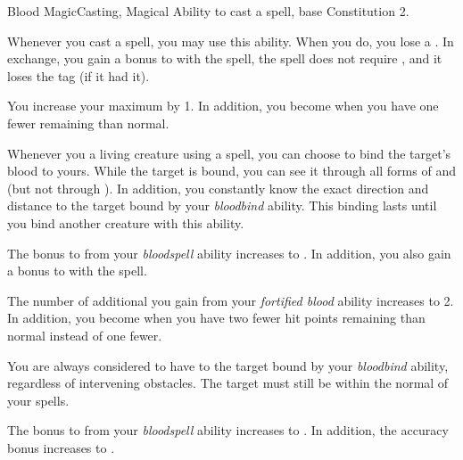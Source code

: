     \begin{feat}{Blood Magic}{Casting, Magical}
        \featpre Ability to cast a spell, base Constitution 2.

         Whenever you cast a spell, you may use this ability.
        When you do, you lose a .
        In exchange, you gain a  bonus to  with the spell, the spell does not require , and it loses the  tag (if it had it).

         You increase your maximum  by 1.
        In addition, you become  when you have one fewer  remaining than normal.

         Whenever you  a living creature using a spell, you can choose to bind the target's blood to yours.
        While the target is bound, you can see it through all forms of  and  (but not through ).
        In addition, you constantly know the exact direction and distance to the target bound by your \textit{bloodbind} ability.
        This binding lasts until you bind another creature with this ability.

         The bonus to  from your \textit{bloodspell} ability increases to .
        In addition, you also gain a  bonus to  with the spell.

         The number of additional  you gain from your \textit{fortified blood} ability increases to 2.
        In addition, you become  when you have two fewer hit points remaining than normal instead of one fewer.

         You are always considered to have  to the target bound by your \textit{bloodbind} ability, regardless of intervening obstacles.
        The target must still be within the normal  of your spells.

         The bonus to  from your \textit{bloodspell} ability increases to .
        In addition, the accuracy bonus increases to .
    \end{feat}

